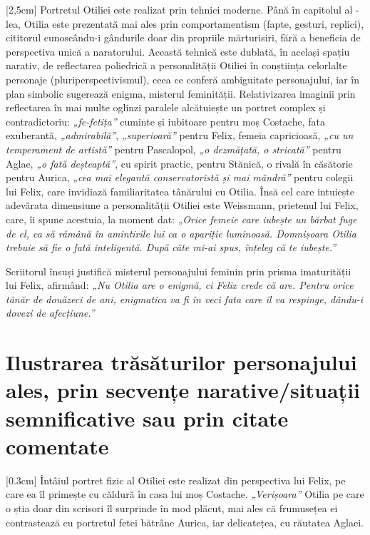 \documentclass[
12pt,
a4paper
]{article}
\newcommand{\rom}[1]{\uppercase\expandafter{\romannumeral #1\relax}} %
\begin{document}
[2,5cm]
Portretul Otiliei este realizat prin tehnici moderne. Până în capitolul al \rom{16}-lea, Otilia este prezentată mai ales prin comportamentism (fapte, gesturi, replici), cititorul cunoscându-i gândurile doar din propriile mărturisiri, fără a beneficia de perspectiva unică a naratorului. Această tehnică este dublată, în același spațiu narativ, de reflectarea poliedrică a personalității Otiliei în conștiința celorlalte personaje (pluriperspectivismul), ceea ce conferă ambiguitate personajului, iar în plan simbolic sugerează enigma, misterul feminității. Relativizarea imaginii prin reflectarea în mai multe oglinzi paralele alcătuiește un portret complex și contradictoriu: \textit{„fe-fetița”} cuminte și iubitoare pentru moș Costache, fata exuberantă, \textit{„admirabilă”}, \textit{„superioară”} pentru Felix, femeia capricioasă, \textit{„cu un temperament de artistă”} pentru Pascalopol, \textit{„o dezmățată, o stricată”} pentru Aglae, \textit{„o fată deșteaptă”}, cu spirit practic, pentru Stănică, o rivală în căsătorie pentru Aurica, \textit{„cea mai elegantă conservatoristă și mai mândră”} pentru colegii lui Felix, care invidiază familiaritatea tânărului cu Otilia. Însă cel care intuiește adevărata dimensiune a personalității Otiliei este Weissmann, prietenul lui Felix, care, îi spune acestuia, la moment dat: \textit{„Orice femeie care iubește un bărbat fuge de el, ca să rămână în amintirile lui ca o apariție luminoasă. Domnișoara Otilia trebuie să fie o fată inteligentă. După câte mi-ai spus, înțeleg că te iubește.”}

Scriitorul însuși justifică misterul personajului feminin prin prisma imaturității lui Felix, afirmând: \textit{„Nu Otilia are o enigmă, ci Felix crede că are. Pentru orice tânăr de douăzeci de ani, enigmatica va fi în veci fata care îl va respinge, dându-i dovezi de afecțiune.”}

\section{Ilustrarea trăsăturilor personajului ales, prin secvențe na\-ra\-ti\-ve/si\-tu\-a\-ții semnificative sau prin citate comentate}

[0.3cm]
Întâiul portret fizic al Otiliei este realizat din perspectiva lui Felix, pe care ea îl primește cu căldură în casa lui moș Costache. \textit{„Verișoara”} Otilia pe care o știa doar din scrisori îl surprinde în mod plăcut, mai ales că frumusețea ei contrastează cu portretul fetei bătrâne Aurica, iar delicatețea, cu răutatea Aglaei.
\end{document}
